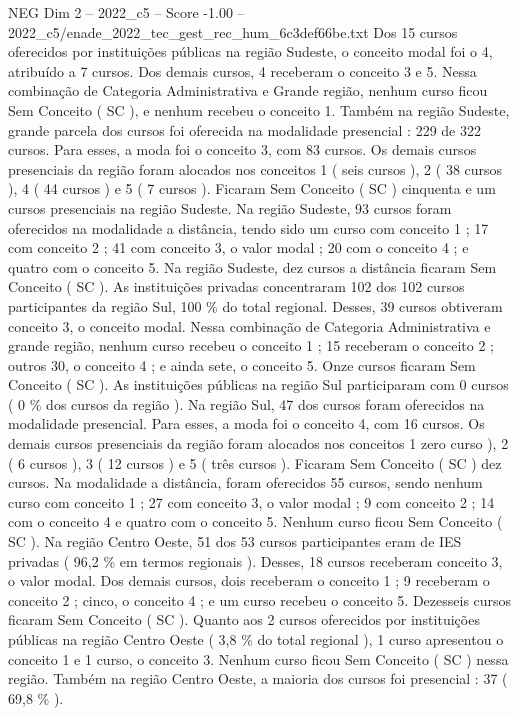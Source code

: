 \begin{textsample}{NEG Dim 2 – 2022\_c5 – Score -1.00 – 2022\_c5/enade\_2022\_tec\_gest\_rec\_hum\_6c3def66be.txt}
Dos 15 cursos oferecidos por instituições públicas na região Sudeste, o conceito modal foi o 4, atribuído a 7 cursos.
Dos demais cursos, 4 receberam o conceito 3 e 5.
Nessa combinação de Categoria Administrativa e Grande região, nenhum curso ficou Sem Conceito ( SC ), e nenhum recebeu o conceito 1.
Também na região Sudeste, grande parcela dos cursos foi oferecida na modalidade presencial : 229 de 322 cursos.
Para esses, a moda foi o conceito 3, com 83 cursos.
Os demais cursos presenciais da região foram alocados nos conceitos 1 ( seis cursos ), 2 ( 38 cursos ), 4 ( 44 cursos ) e 5 ( 7 cursos ).
Ficaram Sem Conceito ( SC ) cinquenta e um cursos presenciais na região Sudeste.
Na região Sudeste, 93 cursos foram oferecidos na modalidade a distância, tendo sido um curso com conceito 1 ; 17 com conceito 2 ; 41 com conceito 3, o valor modal ; 20 com o conceito 4 ; e quatro com o conceito 5.
Na região Sudeste, dez cursos a distância ficaram Sem Conceito ( SC ).
As instituições privadas concentraram 102 dos 102 cursos participantes da região Sul, 100 \% do total regional.
Desses, 39 cursos obtiveram conceito 3, o conceito modal.
Nessa combinação de Categoria Administrativa e grande região, nenhum curso recebeu o conceito 1 ; 15 receberam o conceito 2 ; outros 30, o conceito 4 ; e ainda sete, o conceito 5.
Onze cursos ficaram Sem Conceito ( SC ).
As instituições públicas na região Sul participaram com 0 cursos ( 0 \% dos cursos da região ).
Na região Sul, 47 dos cursos foram oferecidos na modalidade presencial.
Para esses, a moda foi o conceito 4, com 16 cursos.
Os demais cursos presenciais da região foram alocados nos conceitos 1 zero curso ), 2 ( 6 cursos ), 3 ( 12 cursos ) e 5 ( três cursos ).
Ficaram Sem Conceito ( SC ) dez cursos.
Na modalidade a distância, foram oferecidos 55 cursos, sendo nenhum curso com conceito 1 ; 27 com conceito 3, o valor modal ; 9 com conceito 2 ; 14 com o conceito 4 e quatro com o conceito 5.
Nenhum curso ficou Sem Conceito ( SC ).
Na região Centro Oeste, 51 dos 53 cursos participantes eram de IES privadas ( 96,2 \% em termos regionais ).
Desses, 18 cursos receberam conceito 3, o valor modal.
Dos demais cursos, dois receberam o conceito 1 ; 9 receberam o conceito 2 ; cinco, o conceito 4 ; e um curso recebeu o conceito 5.
Dezesseis cursos ficaram Sem Conceito ( SC ).
Quanto aos 2 cursos oferecidos por instituições públicas na região Centro Oeste ( 3,8 \% do total regional ), 1 curso apresentou o conceito 1 e 1 curso, o conceito 3.
Nenhum curso ficou Sem Conceito ( SC ) nessa região.
Também na região Centro Oeste, a maioria dos cursos foi presencial : 37 ( 69,8 \% ).

\end{textsample}
